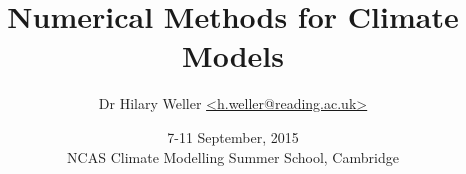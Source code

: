 
\title{Numerical Methods for Climate Models}


\author{Dr Hilary Weller \url{<h.weller@reading.ac.uk>}\\
}


\date{7-11 September, 2015\\
\vspace{1cm}
NCAS Climate Modelling Summer School, Cambridge}\maketitle

